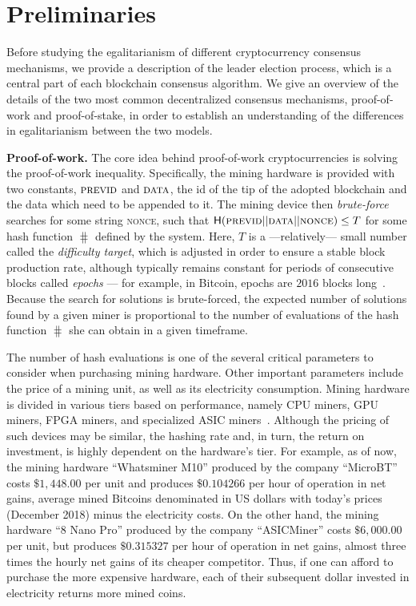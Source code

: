\section{Preliminaries}\label{sec:preliminaries}

Before studying the egalitarianism of different cryptocurrency consensus mechanisms, we
provide a description of the leader election process, which is a central part
of each blockchain consensus algorithm. We give an
overview of the details of the two most common decentralized consensus mechanisms,
proof-of-work and proof-of-stake, in order to establish an understanding of the
differences in egalitarianism between the two models.

\noindent\textbf{Proof-of-work.}
The core idea behind proof-of-work cryptocurrencies is solving the
proof-of-work inequality.  Specifically, the mining hardware is provided with
two constants, $\textsc{previd}$ and $\textsc{data}$, \ie the id of the
tip of the adopted blockchain and the data which need to be appended to it.  The mining
device then \emph{brute-force} searches for some string \textsc{nonce}, such
that $\mathsf{H}(\textsc{previd} || \textsc{data} || \textsc{nonce}) \leq T$ for
some hash function $\hash$ defined by the system. Here, $T$ is a
---relatively--- small number called the \emph{difficulty target}, which is
adjusted in order to ensure a stable block production rate, although typically
remains constant for periods of consecutive blocks called \emph{epochs} --- for
example, in Bitcoin, epochs are $2016$ blocks long~\cite{SP:BMCNKF15}. Because the search for
solutions is brute-forced, the expected number of solutions found by a given
miner is proportional to the number of evaluations of the
hash function $\hash$ she can obtain in a given timeframe.

The number of hash evaluations is one of the several critical parameters to
consider when purchasing mining hardware. Other important parameters include
the price of a mining unit, as well as its electricity consumption.  Mining
hardware is divided in various tiers based on performance, namely CPU miners,
GPU miners, FPGA miners, and specialized ASIC miners~\cite{taylor2013bitcoin}.  Although the pricing of
such devices may be similar, the hashing rate and, in turn, the return on
investment, is highly dependent on the hardware's tier.  For example, as of
now, the mining hardware ``Whatsminer M10'' produced by the company ``MicroBT''
costs $\$1{,}448.00$ per unit and produces $\$0.104266$ per hour of operation in
net gains, \ie average mined Bitcoins denominated in US dollars with today's
prices (December 2018) minus the electricity costs. On the other hand, the
mining hardware ``8 Nano Pro'' produced by the company ``ASICMiner'' costs
$\$6{,}000.00$ per unit, but produces $\$0.315327$ per hour of operation in net
gains, \ie almost three times the hourly net gains of its cheaper competitor.
Thus, if one can afford to purchase the more expensive hardware, each of their
subsequent dollar invested in electricity returns more mined coins.


